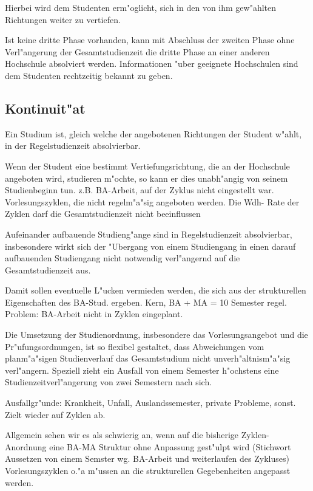 Hierbei wird dem Studenten erm"oglicht, sich in den von ihm gew"ahlten Richtungen
weiter zu vertiefen.

Ist keine dritte Phase vorhanden, kann mit Abschluss der zweiten Phase ohne Verl"angerung der Gesamtstudienzeit die dritte Phase an einer anderen Hochschule absolviert werden. Informationen "uber geeignete Hochschulen sind dem Studenten rechtzeitig bekannt zu geben.


\subsection{Kontinuit"at}

Ein Studium ist, gleich welche der angebotenen Richtungen der Student w"ahlt, 
in der Regelstudienzeit absolvierbar.

\begin{kcmt}\begin{komacmt}
Wenn der Student eine bestimmt Vertiefungsrichtung, die an der Hochschule
angeboten wird, studieren m"ochte, so kann er dies unabh"angig von seinem Studienbeginn 
tun. z.B. BA-Arbeit, auf der Zyklus nicht eingestellt war. Vorlesungszyklen, die nicht 
regelm"a"sig angeboten werden. Die Wdh- Rate der Zyklen darf die Gesamtstudienzeit nicht beeinflussen
\end{komacmt}\end{kcmt}

Aufeinander aufbauende Studieng"ange sind in Regelstudienzeit absolvierbar,
insbesondere wirkt sich der "Ubergang von einem Studiengang in einen darauf aufbauenden Studiengang nicht notwendig verl"angernd 
auf die Gesamtstudienzeit aus.

\begin{kcmt}\begin{komacmt}
Damit sollen eventuelle L"ucken vermieden werden, die sich aus der strukturellen 
Eigenschaften des BA-Stud. ergeben. Kern, BA + MA = 10 Semester regel. Problem: 
BA-Arbeit nicht in Zyklen eingeplant.
\end{komacmt}\end{kcmt}

Die Umsetzung der Studienordnung, insbesondere das Vorlesungsangebot und die 
Pr"ufungsordnungen, ist so flexibel gestaltet, dass Abweichungen vom planm"a"sigen 
Studienverlauf das Gesamtstudium nicht unverh"altnism"a"sig verl"angern. 
Speziell zieht ein Ausfall von einem Semester h"ochstens eine Studienzeitverl"angerung 
von zwei Semestern nach sich.

\begin{kcmt}\begin{komacmt}
Ausfallgr"unde: Krankheit, Unfall, Auslandssemester, private Probleme, sonst. Zielt wieder auf Zyklen ab.


Allgemein sehen wir es als schwierig an, wenn auf die bisherige Zyklen-Anordnung eine 
BA-MA Struktur ohne Anpassung gest"ulpt wird (Stichwort Aussetzen von einem Semster 
wg. BA-Arbeit und weiterlaufen des Zykluses) Vorlesungszyklen o."a m"ussen an die 
strukturellen Gegebenheiten angepasst werden. 
\end{komacmt}\end{kcmt}

